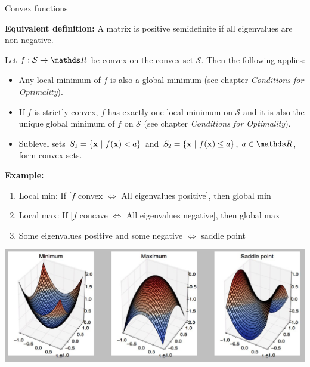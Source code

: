\begin{vbframe}{Convex functions}
\lz

\textbf{Equivalent definition:} A matrix is positive semidefinite if all eigenvalues are non-negative.

\framebreak
Let $f:\mathcal{S} \to \R$ be convex on the convex set $\mathcal{S}$. Then the following applies:

\begin{itemize}
\item Any local minimum of $f$ is also a global minimum (see chapter \emph{Conditions for Optimality}).
\item If $f$ is strictly convex, $f$ has exactly one local minimum on $\mathcal{S}$ and it is also the unique global minimum of $f$ on $\mathcal{S}$ (see chapter \emph{Conditions for Optimality}). 
\item Sublevel sets $S_1 = \{\mathbf{x}~|~f(\mathbf{x}) < a\}$ and $S_2 = \{\mathbf{x}~|~f(\mathbf{x}) \leq a \}$, $a\in \R$, form convex sets.
\end{itemize}

\framebreak


\textbf{Example:}
\footnotesize
\begin{enumerate}
\item Local min: If [$f$ convex $\Leftrightarrow$ All eigenvalues positive], then global min\\
\item Local max: If [$f$ concave $\Leftrightarrow$ All eigenvalues negative], then global max\\
\item Some eigenvalues positive and some negative $\Leftrightarrow$ saddle point
\end{enumerate}

\vspace{0.5cm}

\begin{center}
\includegraphics[scale= 0.5]{figure_man/convex.jpg}
\end{center}


\framebreak



\end{vbframe}
